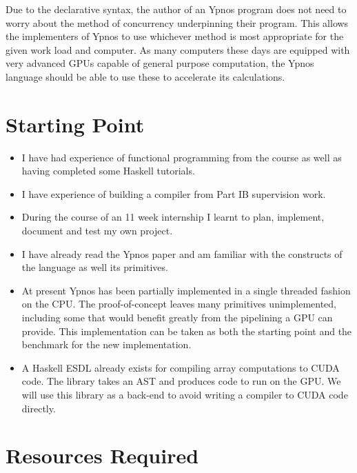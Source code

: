 Due to the declarative syntax, the author of an Ypnos program does not need to 
worry about the method of concurrency underpinning their program. This allows 
the implementers of Ypnos to use whichever method is most appropriate for the 
given work load and computer. As many computers these days are equipped with 
very advanced GPUs capable of general purpose computation, the Ypnos language 
should be able to use these to accelerate its calculations.

\section*{Starting Point}

\begin{itemize}

\item I have had experience of functional programming from the course as well 
as having completed some Haskell tutorials. 

\item I have experience of building a compiler from Part IB supervision work.

\item During the course of an 11 week internship I learnt to plan, implement, 
document and test my own project.

\item I have already read the Ypnos paper and am familiar with the constructs 
of the language as well its primitives.

\item At present Ypnos has been partially implemented in a single threaded 
fashion on the CPU. The proof-of-concept leaves many primitives unimplemented, 
including some that would benefit greatly from the pipelining a GPU can 
provide. This implementation can be taken as both the starting point and the 
benchmark for the new implementation.

\item A Haskell ESDL already exists for compiling array computations to CUDA 
code. The library takes an AST and produces code to run on the GPU. We will use 
this library as a back-end to avoid writing a compiler to CUDA code directly.

\end{itemize}

\section*{Resources Required}

